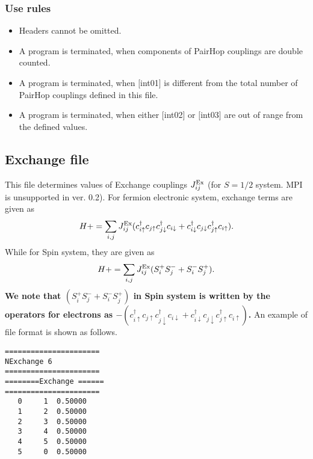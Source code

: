 \subsubsection{Use rules}
\begin{itemize}
\item Headers cannot be omitted. 
\item A program is terminated, when components of PairHop couplings are double counted.
\item A program is terminated, when $[$int01$]$ is different from the total number of PairHop couplings defined in this file.
\item A program is terminated, when either $[$int02$]$ or $[$int03$]$ are out of range from the defined values.
\end{itemize}

\newpage
\subsection{Exchange file}
This file determines values of Exchange couplings $J_{ij}^{\rm Ex}$ {(for $S=1/2$ system. MPI is unsupported in ver. 0.2)}.
For fermion electronic system, exchange terms are given as
\begin{equation}
H+=\sum_{i,j}J_{ij}^{\rm Ex} (c_ {i \uparrow}^{\dag}c_{j\uparrow}c_{j \downarrow}^{\dag}c_{i  \downarrow}+c_ {i \downarrow}^{\dag}c_{j\downarrow}c_{j \uparrow}^{\dag}c_{i  \uparrow}).
\end{equation}
While for Spin system, they are given as
\begin{equation}
H+=\sum_{i,j}J_{ij}^{\rm Ex} (S_ {i}^{+}S_{j}^-+ S_ {i}^{-}S_{j}^+).
\end{equation}
{\bf We note that $(S_i^+S_j^-+S_i^-S_j^+)$ in Spin system is written by the
operators for electrons as 
$-(c_ {i \uparrow}^{\dag}c_{j\uparrow}c_{j \downarrow}^{\dag}c_{i  \downarrow}
+c_ {i \downarrow}^{\dag}c_{j\downarrow}c_{j \uparrow}^{\dag}c_{i  \uparrow})$.
}
An example of file format is shown as follows.

\begin{minipage}{12.5cm}
\begin{screen}
\begin{verbatim}
====================== 
NExchange 6  
====================== 
========Exchange ====== 
====================== 
   0     1  0.50000
   1     2  0.50000
   2     3  0.50000
   3     4  0.50000
   4     5  0.50000
   5     0  0.50000
\end{verbatim}
\end{screen}
\end{minipage}

